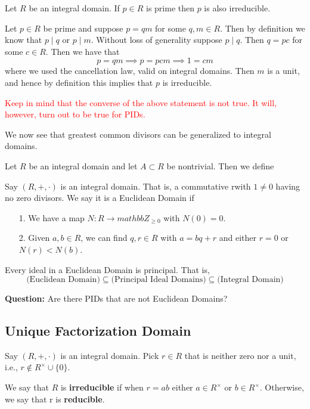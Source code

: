 \begin{proposition}
    Let $R$ be an integral domain. If $p \in R$ is prime then $p$
    is also irreducible.
\end{proposition}

\begin{prf}
    Let $p \in R$ be prime and suppose $p = qm$ for some $q, m \in
    R$. Then by definition we know that $p \mid q$ or $p \mid m$.
    Without loss of generality suppose $p \mid q$. Then $q = pc$
    for some $c \in R$. Then we have that 
    \[
        p = qm \implies p = pcm \implies 1 = cm
    \]
    where we used the cancellation law, valid on integral domains.
    Then $m$ is a unit, and hence by definition this implies that
    $p$ is irreducible. 
\end{prf}

\textcolor{Red}{Keep in mind that the converse of the above statement
is not true. It will, however, turn out to be true for PIDs.}

We now see that greatest common divisors can be generalized to
integral domains. 

\begin{definition}
    Let $R$ be an integral domain and let $A \subset R$ be
    nontrivial. Then we define 
\end{definition}


Say $(R, +, \cdot)$ is an integral domain. That is, a commutative
rwith $1 \ne 0$ having no zero divisors. We say it is a Euclidean
Domain if 
\begin{itemize}
    \item[1.] We have a map $N: R \to mathbb{Z}_{\ge 0}$ with
    $N(0)= 0$.
    \item[2.] Given $a, b \in R$, we can find $q, r \in R$ with $a
    = bq + r$ and either  $r = 0$  or $N(r) < N(b)$. 
\end{itemize}

\begin{proposition}
    Every ideal in a Euclidean Domain is principal. That is, 
    \[
        \text{(Euclidean Domain)} \subseteq \text{(Principal Ideal Domains)} \subseteq \text{(Integral Domain)}   
    \]
\end{proposition}
\textbf{Question:} Are there PIDs that are not Euclidean Domains?

\subsection*{Unique Factorization Domain}
\begin{definition}
    Say $(R, +, \cdot)$ is an integral domain. Pick $r \in R$ that
    is neither zero nor a unit, i.e., $r \not\in
    R^{\times}\cup\{0\}$. 

    We say that $R$ is \textbf{irreducible} if when $r=ab$ either
    $a \in R^{\times}$ or $b \in R^{\times}$. Otherwise, we say
    that r is \textbf{reducible}.
\end{definition}

